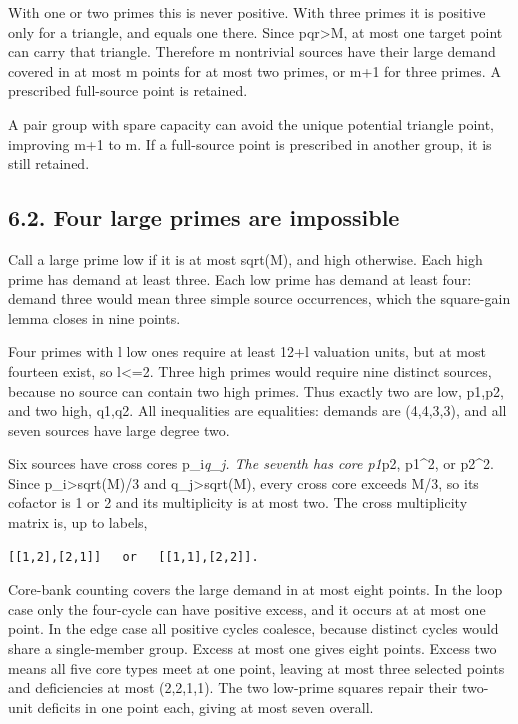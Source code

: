 \documentclass[11pt,a4paper]{article}
\begin{document}
With one or two primes this is never positive. With three primes it is
positive only for a triangle, and equals one there. Since
pqr\textgreater M, at most one target point can carry that triangle.
Therefore m nontrivial sources have their large demand covered in at
most m points for at most two primes, or m+1 for three primes. A
prescribed full-source point is retained.

A pair group with spare capacity can avoid the unique potential triangle
point, improving m+1 to m. If a full-source point is prescribed in
another group, it is still retained.

\subsection{6.2. Four large primes are
impossible}\label{four-large-primes-are-impossible}

Call a large prime low if it is at most sqrt(M), and high otherwise.
Each high prime has demand at least three. Each low prime has demand at
least four: demand three would mean three simple source occurrences,
which the square-gain lemma closes in nine points.

Four primes with l low ones require at least 12+l valuation units, but
at most fourteen exist, so l\textless=2. Three high primes would require
nine distinct sources, because no source can contain two high primes.
Thus exactly two are low, p1,p2, and two high, q1,q2. All inequalities
are equalities: demands are (4,4,3,3), and all seven sources have large
degree two.

Six sources have cross cores p\_i\emph{q\_j. The seventh has core p1}p2,
p1\^{}2, or p2\^{}2. Since p\_i\textgreater sqrt(M)/3 and
q\_j\textgreater sqrt(M), every cross core exceeds M/3, so its cofactor
is 1 or 2 and its multiplicity is at most two. The cross multiplicity
matrix is, up to labels,

\begin{verbatim}
[[1,2],[2,1]]   or   [[1,1],[2,2]].
\end{verbatim}

Core-bank counting covers the large demand in at most eight points. In
the loop case only the four-cycle can have positive excess, and it
occurs at at most one point. In the edge case all positive cycles
coalesce, because distinct cycles would share a single-member group.
Excess at most one gives eight points. Excess two means all five core
types meet at one point, leaving at most three selected points and
deficiencies at most (2,2,1,1). The two low-prime squares repair their
two-unit deficits in one point each, giving at most seven overall.
\end{document}
